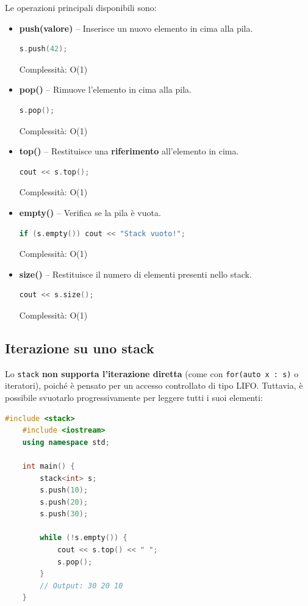 Le operazioni principali disponibili sono:

\begin{itemize}
	\item \textbf{push(valore)} – Inserisce un nuovo elemento in cima alla pila.
	\begin{lstlisting}[language=C++]
		s.push(42);
	\end{lstlisting}
	Complessità: O(1)
	
	\item \textbf{pop()} – Rimuove l’elemento in cima alla pila.
	\begin{lstlisting}[language=C++]
		s.pop();
	\end{lstlisting}
	Complessità: O(1)
	
	\item \textbf{top()} – Restituisce una \textbf{riferimento} all’elemento in cima.
	\begin{lstlisting}[language=C++]
		cout << s.top();
	\end{lstlisting}
	Complessità: O(1)
	
	\item \textbf{empty()} – Verifica se la pila è vuota.
	\begin{lstlisting}[language=C++]
		if (s.empty()) cout << "Stack vuoto!";
	\end{lstlisting}
	Complessità: O(1)
	
	\item \textbf{size()} – Restituisce il numero di elementi presenti nello stack.
	\begin{lstlisting}[language=C++]
		cout << s.size();
	\end{lstlisting}
	Complessità: O(1)
\end{itemize}

\subsection{Iterazione su uno stack}

Lo \texttt{stack} \textbf{non supporta l’iterazione diretta} (come con \texttt{for(auto x : s)} o iteratori), poiché è pensato per un accesso controllato di tipo LIFO.  
Tuttavia, è possibile svuotarlo progressivamente per leggere tutti i suoi elementi:

\begin{lstlisting}[language=C++]
	#include <stack>
	#include <iostream>
	using namespace std;
	
	int main() {
		stack<int> s;
		s.push(10);
		s.push(20);
		s.push(30);
		
		while (!s.empty()) {
			cout << s.top() << " ";
			s.pop();
		}
		// Output: 30 20 10
	}
\end{lstlisting}

